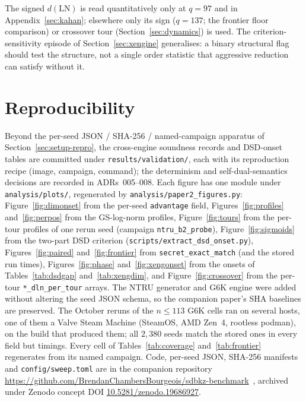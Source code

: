 \documentclass[journal=cic,version=preprint]{iacrj}
\begin{document}
The signed
$d(\mathrm{LN})$ is read quantitatively only at $q=97$ and in
Appendix~\ref{sec:kahan}; elsewhere only its sign ($q=137$; the frontier
floor comparison) or crossover tour (Section~\ref{sec:dynamics}) is used. The criterion-sensitivity episode of
Section~\ref{sec:xengine} generalises: a binary structural flag should test
the structure, not a single order statistic that aggressive reduction can
satisfy without it.

\section{Reproducibility}
\label{sec:repro}
Beyond the per-seed JSON / SHA-256 / named-campaign apparatus of
Section~\ref{sec:setup-repro}, the cross-engine soundness records and
DSD-onset tables are committed under
\texttt{results/}\allowbreak\texttt{validation/}, each with its reproduction
recipe (image, campaign, command); the determinism and self-dual-semantics
decisions are recorded in ADRs~005--008. Each figure has one module under
\texttt{analysis/plots/}, regenerated by \texttt{analysis/paper2\_figures.py}:
Figure~\ref{fig:dimonset} from the per-seed \texttt{advantage} field,
Figures~\ref{fig:profiles} and~\ref{fig:perpos} from the GS-log-norm profiles,
Figure~\ref{fig:tours} from the per-tour profiles of one rerun seed (campaign \texttt{ntru\_b2\_probe}),
Figure~\ref{fig:sigmoids} from the two-part DSD
criterion (\texttt{scripts/extract\_dsd\_onset.py}),
Figures~\ref{fig:paired} and~\ref{fig:frontier} from \texttt{secret\_exact\_match} (and the stored run times),
Figures~\ref{fig:phase} and~\ref{fig:xengonset} from the onsets of
Tables~\ref{tab:dsdgap} and~\ref{tab:xengdim}, and Figure~\ref{fig:crossover} from the per-tour
\texttt{*\_dln\_per\_tour} arrays. The NTRU generator and G6K engine were
added without altering the seed JSON schema, so the companion paper's SHA
baselines are preserved. The October reruns of the $n\le113$ G6K cells
ran on several hosts, one of them a Valve Steam Machine (SteamOS, AMD Zen~4,
rootless podman), on the build that produced them; all $2{,}380$ seeds match
the stored ones in every field but timings. Every cell of Tables~\ref{tab:coverage}
and~\ref{tab:frontier} regenerates from its named campaign. Code, per-seed
JSON, SHA-256 manifests and \texttt{config/sweep.toml} are in the companion
repository
\url{https://github.com/BrendanChambersBourgeois/sdbkz-benchmark}~\cite{Paper1},
archived under Zenodo concept DOI
\href{https://doi.org/10.5281/zenodo.19686927}{10.5281/zenodo.19686927}.
\end{document}
